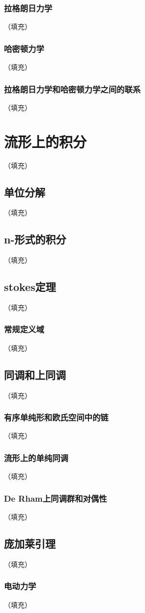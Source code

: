 \documentclass[hyperref,UTF8]{ctexbook}
\begin{document}
\subsection{拉格朗日力学}（填充）
\subsection{哈密顿力学}（填充）
\subsection{拉格朗日力学和哈密顿力学之间的联系}（填充）
\chapter{流形上的积分}（填充）
\section{单位分解}（填充）
\section{n-形式的积分}（填充）
\section{stokes定理}（填充）
\subsection{常规定义域}（填充）
\section{同调和上同调}（填充）
\subsection{有序单纯形和欧氏空间中的链}（填充）
\subsection{流形上的单纯同调}（填充）
\subsection{De Rham上同调群和对偶性}（填充）
\section{庞加莱引理}（填充）
\subsection{电动力学}（填充）
\end{document}
